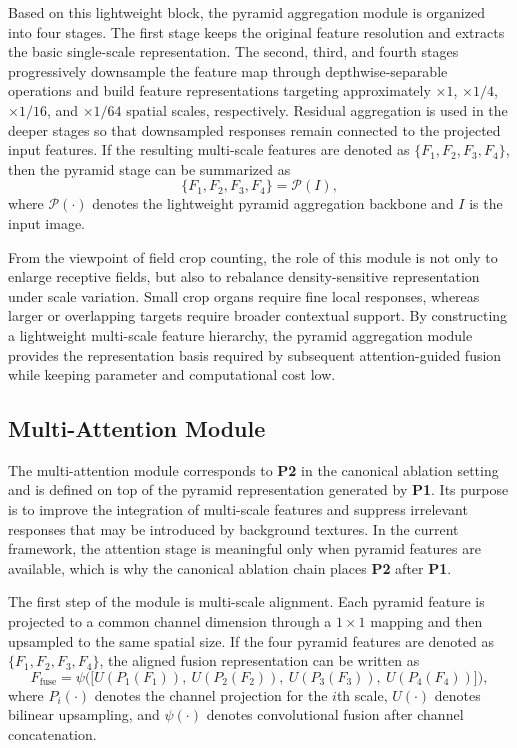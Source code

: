 \documentclass[a4paper,fleqn]{cas-sc}
\begin{document}
Based on this lightweight block, the pyramid aggregation module is organized into four stages. The first stage keeps the original feature resolution and extracts the basic single-scale representation. The second, third, and fourth stages progressively downsample the feature map through depthwise-separable operations and build feature representations targeting approximately $\times1$, $\times1/4$, $\times1/16$, and $\times1/64$ spatial scales, respectively. Residual aggregation is used in the deeper stages so that downsampled responses remain connected to the projected input features. If the resulting multi-scale features are denoted as $\{F_1, F_2, F_3, F_4\}$, then the pyramid stage can be summarized as
\begin{equation}
    \{F_1, F_2, F_3, F_4\} = \mathcal{P}(I),
\end{equation}
where $\mathcal{P}(\cdot)$ denotes the lightweight pyramid aggregation backbone and $I$ is the input image.

From the viewpoint of field crop counting, the role of this module is not only to enlarge receptive fields, but also to rebalance density-sensitive representation under scale variation. Small crop organs require fine local responses, whereas larger or overlapping targets require broader contextual support. By constructing a lightweight multi-scale feature hierarchy, the pyramid aggregation module provides the representation basis required by subsequent attention-guided fusion while keeping parameter and computational cost low.

\subsection{Multi-Attention Module}

The multi-attention module corresponds to \textbf{P2} in the canonical ablation setting and is defined on top of the pyramid representation generated by \textbf{P1}. Its purpose is to improve the integration of multi-scale features and suppress irrelevant responses that may be introduced by background textures. In the current framework, the attention stage is meaningful only when pyramid features are available, which is why the canonical ablation chain places \textbf{P2} after \textbf{P1}.

The first step of the module is multi-scale alignment. Each pyramid feature is projected to a common channel dimension through a $1 \times 1$ mapping and then upsampled to the same spatial size. If the four pyramid features are denoted as $\{F_1, F_2, F_3, F_4\}$, the aligned fusion representation can be written as
\begin{equation}
    F_{\mathrm{fuse}} = \psi \Big( \big[ U(P_1(F_1)),\ U(P_2(F_2)),\ U(P_3(F_3)),\ U(P_4(F_4)) \big] \Big),
\end{equation}
where $P_i(\cdot)$ denotes the channel projection for the $i$th scale, $U(\cdot)$ denotes bilinear upsampling, and $\psi(\cdot)$ denotes convolutional fusion after channel concatenation.
\end{document}

